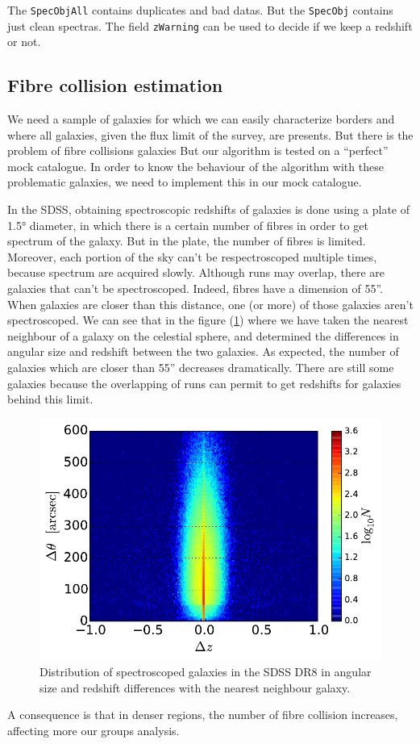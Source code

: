 The \texttt{SpecObjAll} contains duplicates and bad datas. But the
\texttt{SpecObj} contains just clean spectras. The field \texttt{zWarning}
can be used to decide if we keep a redshift or not.
%
\subsection{Fibre collision estimation}
%
We need a sample of galaxies for which we can easily characterize borders
and where all galaxies, given the flux limit of the survey, are presents.
But there is the problem of fibre collisions galaxies But our algorithm is
tested on a ``perfect'' mock catalogue. In order to know the behaviour of
the algorithm with these problematic galaxies, we need to implement this in
our mock catalogue.

In the SDSS, obtaining spectroscopic redshifts of galaxies is done using a
plate of 1.5° diameter, in which there is a certain number of fibres in
order to get spectrum of the galaxy. But in the plate, the number of fibres
is limited. Moreover, each portion of the sky can't be respectroscoped
multiple times, because spectrum are acquired slowly. Although runs may
overlap, there are galaxies that can't be spectroscoped. Indeed, fibres have
a dimension of 55''. When galaxies are closer than this distance, one (or
more) of those galaxies aren't spectroscoped. We can see that in the figure
(\ref{fig:plane}) where we have taken the nearest neighbour of a galaxy
on the celestial sphere, and determined the differences in angular size and
redshift between the two galaxies. As expected, the number of galaxies which
are closer than 55'' decreases dramatically. There are still some galaxies
because the overlapping of runs can permit to get redshifts for galaxies
behind this limit.
%
\begin{figure}[ht]
    \centering
    \includegraphics[width=0.6\linewidth]{figures/sdss/plane.pdf}
    \caption{\footnotesize{}Distribution of spectroscoped galaxies in the
    SDSS DR8 in angular size and redshift differences with the nearest
neighbour galaxy.\label{fig:plane}}
\end{figure}
%
A consequence is that in denser regions, the number of fibre collision
increases, affecting more our groups analysis.


